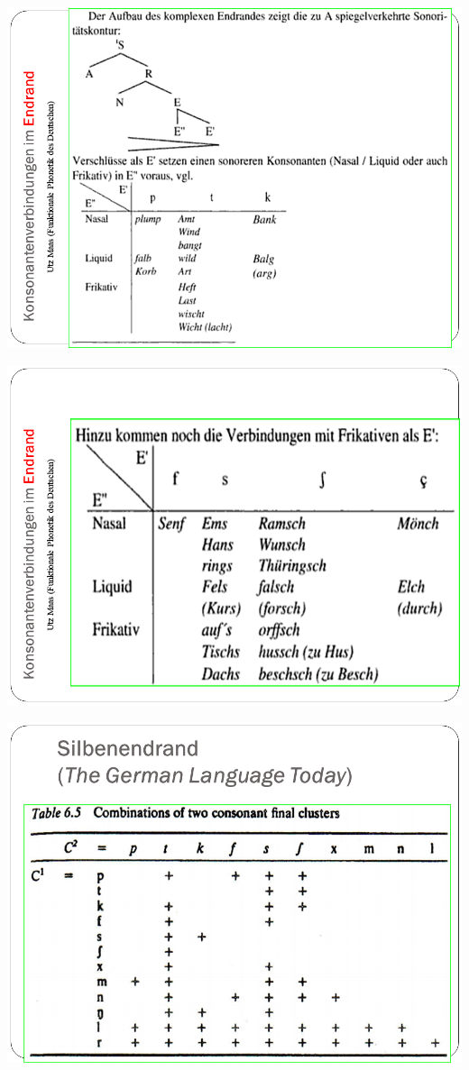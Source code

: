 \documentclass[
  letterpaper,
]{scrbook}
\begin{document}
\includegraphics[width=1\textwidth,height=\textheight]{./pictures/Wagner_Maas_Duden_Petric_45.PNG}

\includegraphics[width=1\textwidth,height=\textheight]{./pictures/Wagner_Maas_Duden_Petric_46.PNG}

\includegraphics[width=1\textwidth,height=\textheight]{./pictures/Wagner_Maas_Duden_Petric_47.PNG}
\end{document}
